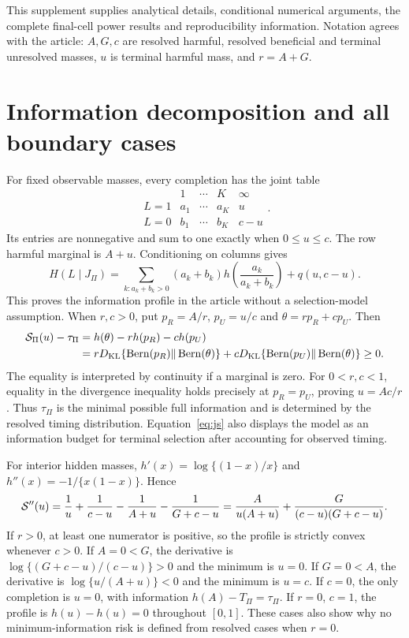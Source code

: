 This supplement supplies analytical details, conditional numerical arguments, the complete final-cell power results and reproducibility information. Notation agrees with the article: $A,G,c$ are resolved harmful, resolved beneficial and terminal unresolved masses, $u$ is terminal harmful mass, and $r=A+G$.

\section{Information decomposition and all boundary cases}
For fixed observable masses, every completion has the joint table
\begin{equation}
 \begin{array}{c|cccc} &1&\cdots&K&\infty\\\hline
 L=1&a_1&\cdots&a_K&u\\
 L=0&b_1&\cdots&b_K&c-u
 \end{array}.
\end{equation}
Its entries are nonnegative and sum to one exactly when $0\le u\le c$. The row harmful marginal is $A+u$. Conditioning on columns gives
\begin{equation}
 H(L\mid J_\Pi)=\sum_{k:a_k+b_k>0}(a_k+b_k)h\left(\frac{a_k}{a_k+b_k}\right)+q(u,c-u).
\end{equation}
This proves the information profile in the article without a selection-model assumption. When $r,c>0$, put $p_R=A/r$, $p_U=u/c$ and $\theta=rp_R+cp_U$. Then
\begin{align}
 \mathcal S_\Pi(u)-\tau_\Pi
 &=h(\theta)-r h(p_R)-c h(p_U)\\
 &=rD_{\mathrm{KL}}\{\operatorname{Bern}(p_R)\Vert\operatorname{Bern}(\theta)\}
 +cD_{\mathrm{KL}}\{\operatorname{Bern}(p_U)\Vert\operatorname{Bern}(\theta)\}\ge0.\label{eq:js}
\end{align}
The equality is interpreted by continuity if a marginal is zero. For $0<r,c<1$, equality in the divergence inequality holds precisely at $p_R=p_U$, proving $u=Ac/r$. Thus $\tau_\Pi$ is the minimal possible full information and is determined by the resolved timing distribution. Equation~\eqref{eq:js} also displays the model as an information budget for terminal selection after accounting for observed timing.

For interior hidden masses, $h'(x)=\log\{(1-x)/x\}$ and $h''(x)=-1/\{x(1-x)\}$. Hence
\begin{equation}
 \mathcal S''(u)=\frac1u+\frac1{c-u}-\frac1{A+u}-\frac1{G+c-u}
 =\frac{A}{u(A+u)}+\frac{G}{(c-u)(G+c-u)}.
\end{equation}
If $r>0$, at least one numerator is positive, so the profile is strictly convex whenever $c>0$. If $A=0<G$, the derivative is $\log\{(G+c-u)/(c-u)\}>0$ and the minimum is $u=0$. If $G=0<A$, the derivative is $\log\{u/(A+u)\}<0$ and the minimum is $u=c$. If $c=0$, the only completion is $u=0$, with information $h(A)-T_\Pi=\tau_\Pi$. If $r=0$, $c=1$, the profile is $h(u)-h(u)=0$ throughout $[0,1]$. These cases also show why no minimum-information risk is defined from resolved cases when $r=0$.

